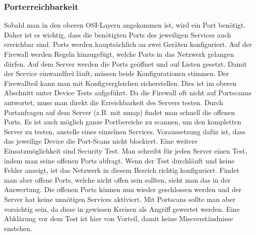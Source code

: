\documentclass[a4,12pt]{scrartcl}
\begin{document}
\subsubsection{Porterreichbarkeit}
Sobald man in den oberen OSI-Layern angekommen ist, wird ein Port benötigt. Daher ist es wichtig, dass die benötigten Ports des jeweiligen Services auch erreichbar sind.\newline\newline
Ports werden hauptsächlich an zwei Geräten konfiguriert. Auf der Firewall werden Regeln hinzugefügt, welche Ports in das Netzwerk gelangen dürfen. Auf dem Server werden die Ports geöffnet und auf Listen gesetzt. Damit der Service einwandfrei läuft, müssen beide Konfigurationen stimmen. Der Firewallteil kann man mit Konfigvergleichen sicherstellen. Dies ist im oberen Abschnitt unter Device Tests aufgeführt.\newline\newline
Da die Firewall oft nicht auf Portscanns antwortet, muss man direkt die Erreichbarkeit des Servers testen. Durch Portanfragen auf dem Server (z.B. mit nmap) findet man schnell die offenen Ports. Es ist auch möglich ganze Portbereiche zu scannen, um den kompletten Server zu testen, anstelle eines einzelnen Services. Voraussetzung dafür ist, dass das jeweilige Device die Port-Scans nicht blockiert.\newline\newline
Eine weitere Einsatzmöglichkeit sind Security Test. Man schreibt für jeden Server einen Test, indem man seine offenen Ports abfragt. Wenn der Test durchläuft und keine Fehler anzeigt, ist das Netzwerk in diesem Bereich richtig konfiguriert. Findet man aber offene Ports, welche nicht offen sein sollten, sieht man das in der Auswertung. Die offenen Ports können nun wieder geschlossen werden und der Server hat keine unnötigen Services aktiviert.\newline\newline
Mit Portscans sollte man aber vorsichtig sein, da diese in gewissen Kreisen als Angriff gewertet werden. Eine Abklärung vor dem Test ist hier von Vorteil, damit keine Missverständnisse enstehen.\\
\end{document}

